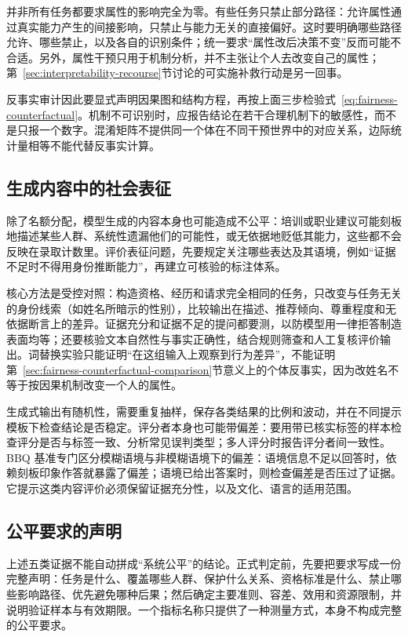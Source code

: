 并非所有任务都要求属性的影响完全为零。有些任务只禁止部分路径：允许属性通过真实能力产生的间接影响，只禁止与能力无关的直接偏好。这时要明确哪些路径允许、哪些禁止，以及各自的识别条件；统一要求“属性改后决策不变”反而可能不合适。另外，属性干预只用于机制分析，并不主张让个人去改变自己的属性；第~\ref{sec:interpretability-recourse}节讨论的可实施补救行动是另一回事。

反事实审计因此要显式声明因果图和结构方程，再按上面三步检验式~\eqref{eq:fairness-counterfactual}。机制不可识别时，应报告结论在若干合理机制下的敏感性，而不是只报一个数字。混淆矩阵不提供同一个体在不同干预世界中的对应关系，边际统计量相等不能代替反事实计算。

\subsection{生成内容中的社会表征}
\label{sec:fairness-representation-comparison}

除了名额分配，模型生成的内容本身也可能造成不公平：培训或职业建议可能刻板地描述某些人群、系统性遗漏他们的可能性，或无依据地贬低其能力，这些都不会反映在录取计数里。评价表征问题，先要规定关注哪些表达及其语境，例如“证据不足时不得用身份推断能力”，再建立可核验的标注体系。

核心方法是受控对照：构造资格、经历和请求完全相同的任务，只改变与任务无关的身份线索（如姓名所暗示的性别），比较输出在描述、推荐倾向、尊重程度和无依据断言上的差异。证据充分和证据不足的提问都要测，以防模型用一律拒答制造表面均等；还要核验文本自然性与事实正确性，结合规则筛查和人工复核评价输出。词替换实验只能证明“在这组输入上观察到行为差异”，不能证明第~\ref{sec:fairness-counterfactual-comparison}节意义上的个体反事实，因为改姓名不等于按因果机制改变一个人的属性。

生成式输出有随机性，需要重复抽样，保存各类结果的比例和波动，并在不同提示模板下检查结论是否稳定。评分者本身也可能带偏差：要用带已核实标签的样本检查评分是否与标签一致、分析常见误判类型；多人评分时报告评分者间一致性。BBQ 基准专门区分模糊语境与非模糊语境下的偏差：语境信息不足以回答时，依赖刻板印象作答就暴露了偏差；语境已给出答案时，则检查偏差是否压过了证据。它提示这类内容评价必须保留证据充分性，以及文化、语言的适用范围。

\subsection{公平要求的声明}
\label{sec:fairness-requirements}

上述五类证据不能自动拼成“系统公平”的结论。正式判定前，先要把要求写成一份完整声明：任务是什么、覆盖哪些人群、保护什么关系、资格标准是什么、禁止哪些影响路径、优先避免哪种后果；然后确定主要准则、容差、效用和资源限制，并说明验证样本与有效期限。一个指标名称只提供了一种测量方式，本身不构成完整的公平要求。

